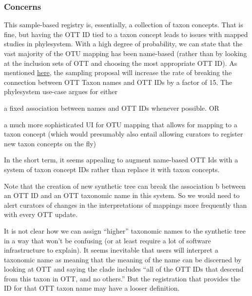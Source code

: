 \documentclass[11pt]{article}
\begin{document}
\subsubsection{Concerns}
\begin{compactenum}
  \item This sample-based registry is, essentially, a collection of taxon concepts. That is fine, but having the OTT ID tied to a taxon concept leads to issues
  with mapped studies in phylesystem.
  With a high degree of probability, we can state that the vast majority of the 
  OTU mapping has been name-based (rather than by looking at the inclusion
    sets of OTT and choosing the most appropriate OTT ID).
  As mentioned \href{https://docs.google.com/document/d/1hJHjMckLywnoBuY1xG3I0hP-rsl4l8du3iA8kflEOQE/edit?pli=1#heading=h.aqib3hn3t8nx}{here},
  the sampling proposal will increase the rate of breaking the connection
  between OTT Taxon names and OTT IDs by a factor of 15.
  The phylesystem use-case argues for either
  \begin{compactenum}
    \item a fixed association between names and OTT IDs whenever possible. OR
    \item a much more sophisticated UI for OTU mapping that allows for mapping
      to a taxon concept (which would presumably also entail allowing curators to
      register new taxon concepts on the fly)
  \end{compactenum}
  In the short term, it seems appealing to augment name-based OTT Ids with a system of taxon concept IDs rather 
  than replace it with taxon concepts.
  \item Note that the creation of new synthetic tree can break the association b
  between an OTT ID and an OTT taxonomic name in this system.
  So we would need to alert curators of changes in the interpretations of 
  mappings more frequently than with every OTT update.
  \item It is not clear how we can assign ``higher'' taxonomic names to the 
  synthetic tree in a way that won't be confusing (or at least require a lot
  of software infrastructure to explain).
  It seems inevitable that users will interpret a taxonomic name as meaning
  that the meaning of the name can be discerned by looking at OTT and saying
  the clade includes ``all of the OTT IDs that descend from this taxon in OTT, 
  and no others.''
  But the registration that provides the ID for that OTT taxon name may have a
    looser definition.
\end{compactenum}
\end{document}
